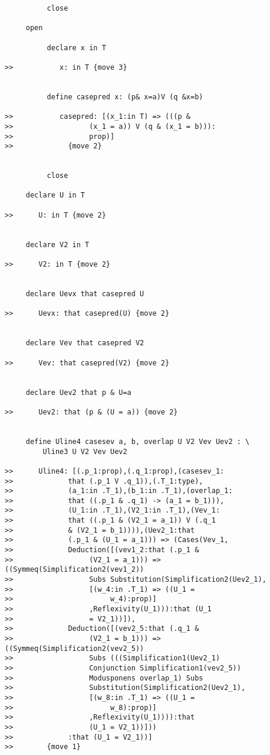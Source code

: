 \documentclass[12pt]{article}
\begin{document}
\begin{verbatim}
          close

     open 

          declare x in T

>>           x: in T {move 3}


          define casepred x: (p& x=a)V (q &x=b)

>>           casepred: [(x_1:in T) => (((p & 
>>                  (x_1 = a)) V (q & (x_1 = b))):
>>                  prop)]
>>             {move 2}


          close

     declare U in T

>>      U: in T {move 2}


     declare V2 in T

>>      V2: in T {move 2}


     declare Uevx that casepred U

>>      Uevx: that casepred(U) {move 2}


     declare Vev that casepred V2

>>      Vev: that casepred(V2) {move 2}


     declare Uev2 that p & U=a

>>      Uev2: that (p & (U = a)) {move 2}


     define Uline4 casesev a, b, overlap U V2 Vev Uev2 : \
         Uline3 U V2 Vev Uev2

>>      Uline4: [(.p_1:prop),(.q_1:prop),(casesev_1:
>>             that (.p_1 V .q_1)),(.T_1:type),
>>             (a_1:in .T_1),(b_1:in .T_1),(overlap_1:
>>             that ((.p_1 & .q_1) -> (a_1 = b_1))),
>>             (U_1:in .T_1),(V2_1:in .T_1),(Vev_1:
>>             that ((.p_1 & (V2_1 = a_1)) V (.q_1 
>>             & (V2_1 = b_1)))),(Uev2_1:that 
>>             (.p_1 & (U_1 = a_1))) => (Cases(Vev_1,
>>             Deduction([(vev1_2:that (.p_1 & 
>>                  (V2_1 = a_1))) => ((Symmeq(Simplification2(vev1_2)) 
>>                  Subs Substitution(Simplification2(Uev2_1),
>>                  [(w_4:in .T_1) => ((U_1 = 
>>                       w_4):prop)]
>>                  ,Reflexivity(U_1))):that (U_1 
>>                  = V2_1))]),
>>             Deduction([(vev2_5:that (.q_1 & 
>>                  (V2_1 = b_1))) => ((Symmeq(Simplification2(vev2_5)) 
>>                  Subs (((Simplification1(Uev2_1) 
>>                  Conjunction Simplification1(vev2_5)) 
>>                  Modusponens overlap_1) Subs 
>>                  Substitution(Simplification2(Uev2_1),
>>                  [(w_8:in .T_1) => ((U_1 = 
>>                       w_8):prop)]
>>                  ,Reflexivity(U_1)))):that 
>>                  (U_1 = V2_1))]))
>>             :that (U_1 = V2_1))]
>>        {move 1}



\end{verbatim}
\end{document}
